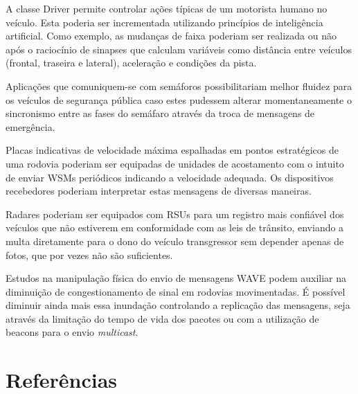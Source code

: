 \documentclass[
12pt,				%
openright,			%
oneside,			%
a4paper,			%
brazil,				%
]{abntex2}
\begin{document}
{	\par A classe Driver permite controlar ações típicas de um motorista humano no veículo. Esta poderia ser incrementada utilizando princípios de inteligência artificial. Como exemplo, as mudanças de faixa poderiam ser realizada ou não após o raciocínio de sinapses que calculam variáveis como distância entre veículos (frontal, traseira e lateral), aceleração e condições da pista.

	\par Aplicações que comuniquem-se com semáforos possibilitariam melhor fluidez para os veículos de segurança pública caso estes pudessem alterar momentaneamente o sincronismo entre as fases do semáfaro através da troca de mensagens de emergência.

	\par Placas indicativas de velocidade máxima espalhadas em pontos estratégicos de uma rodovia poderiam ser equipadas de unidades de acostamento com o intuito de enviar WSMs periódicos indicando a velocidade adequada. Os dispositivos recebedores poderiam interpretar estas mensagens de diversas maneiras.

	\par Radares poderiam ser equipados com RSUs para um registro mais confiável dos veículos que não estiverem em conformidade com as leis de trânsito, enviando a multa diretamente para o dono do veículo transgressor sem depender apenas de fotos, que por vezes não são suficientes.

	\par Estudos na manipulação física do envio de mensagens WAVE podem auxiliar na diminuição de congestionamento de sinal em rodovias movimentadas. É possível diminuir ainda mais essa inundação controlando a replicação das mensagens, seja através da limitação do tempo de vida dos pacotes ou com a utilização de beacons para o envio \textit{multicast}.

	\postextual


	\newpage
	\chapter*[Referências]{Referências}
	\flushleft

}
\end{document}
